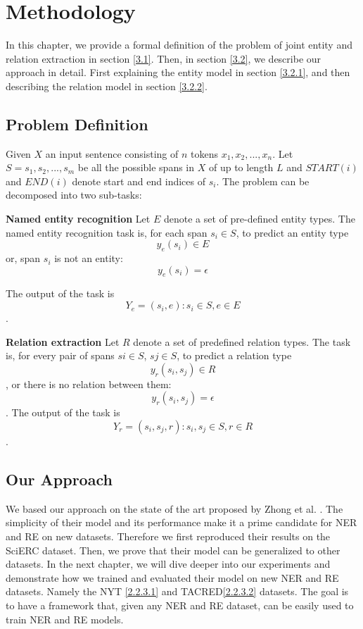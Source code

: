 \chapter{Methodology}
\label{chp:methodology}

In this chapter, we provide a formal definition of the problem of joint entity and relation extraction in section \hyperref[sec:probdef]{[3.1]}. Then, in section \hyperref[sec:approach]{[3.2]}, we describe our approach in detail. First explaining the entity model in section \hyperref[sec:entitymodel]{[3.2.1]}, and then describing the relation model in section \hyperref[sec:relationmodel]{[3.2.2]}.
\section{Problem Definition}
\label{sec:probdef}
Given \(X\) an input sentence consisting of \(n\) tokens \(x_1,x_2,...,x_n\). Let \(S = {s_1, s_2,...,s_m}\) be all the possible spans in \(X\) of up to length \(L\) and \(START(i)\) and \(END(i)\) denote start and end indices of \(s_i\). The problem can be decomposed into two sub-tasks:

\textbf{Named entity recognition} Let \(E\) denote a set of pre-defined entity types. The named entity recognition task is, for each span \(s_i \in S\), to predict an entity type \[y_e(s_i) \in E\] or, span \(s_i\) is not an entity: \[y_e(s_i) =\epsilon\]

The output of the task is \[Y_e = {(s_i , e) : s_i \in S, e \in E}\].


\textbf{Relation extraction} Let \(R\) denote a set of predefined relation types. The task is, for every pair of spans \(si \in S\), \(sj \in S\), to predict a relation type \[y_r(s_i , s_j ) \in R\], or there is no relation between them: \[y_r(s_i , s_j ) =\epsilon\]. The output of the task is \[Y_r = {(s_i , s_j , r) : s_i , s_j \in S, r \in R}\].

\section{Our Approach}
\label{sec:approach}

We based our approach on the state of the art proposed by Zhong et al. \cite{Zhong2020AFE}. The simplicity of their model and its performance make it a prime candidate for NER and RE on new datasets. Therefore we first reproduced their results on the SciERC dataset. Then, we prove that their model can be generalized to other datasets. In the next chapter, we will dive deeper into our experiments and demonstrate how we trained and evaluated their model on new NER and RE datasets. Namely the NYT \hyperref[sec:nytdataset]{[2.2.3.1]} and TACRED\hyperref[sec:tacreddataset]{[2.2.3.2]} datasets. The goal is to have a framework that, given any NER and RE dataset, can be easily used to train NER and RE models.\\

